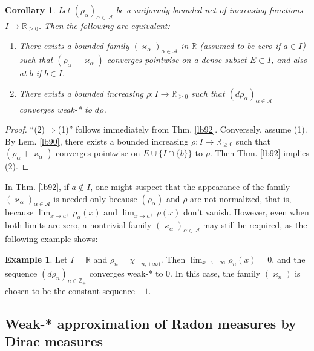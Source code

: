 \documentclass[12pt,b5paper,notitlepage]{article}
\theoremstyle{definition}
\newtheorem{eg}[df]{Example}
\theoremstyle{plain}
\newtheorem{co}[df]{Corollary}
\newcommand{\scr}{\mathscr}
\newcommand{\Zbb}{\mathbb Z}
\newcommand{\Rbb}{\mathbb R}
\newcommand{\SA}{\mathscr A}
\numberwithin{equation}{section}
\begin{document}
\begin{co}\label{lb95}
Let $(\rho_\alpha)_{\alpha\in\scr A}$ be a uniformly bounded net of increasing functions $I\rightarrow\Rbb_{\geq0}$. Then the following are equivalent:
\begin{enumerate}[label=(\arabic*)]
\item There exists a bounded family $(\varkappa_\alpha)_{\alpha\in\scr A}$ in $\Rbb$ (assumed to be zero if $a\in I$) such that $(\rho_\alpha+\varkappa_\alpha)$ converges pointwise on a dense subset $E\subset I$, and also at $b$ if $b\in I$.
\item There exists a bounded increasing $\rho:I\rightarrow\Rbb_{\geq0}$ such that $(d\rho_\alpha)_{\alpha\in\scr A}$ converges weak-* to $d\rho$.
\end{enumerate}
\end{co}


\begin{proof}
``(2)$\Rightarrow$(1)'' follows immediately from Thm. \ref{lb92}. Conversely, assume (1). By Lem. \ref{lb90}, there exists a bounded increasing $\rho:I\rightarrow\Rbb_{\geq0}$ such that $(\rho_\alpha+\varkappa_\alpha)$ converges pointwise on $E\cup\{I\cap\{b\}\}$ to $\rho$. Then Thm. \ref{lb92} implies (2).
\end{proof}


In Thm. \ref{lb92}, if $a\notin I$, one might suspect that the appearance of the family $(\varkappa_\alpha)_{\alpha\in\SA}$ is needed only because $(\rho_\alpha)$ and $\rho$ are not normalized, that is, because $\lim_{x\rightarrow a^+}\rho_\alpha(x)$ and $\lim_{x\rightarrow a^+}\rho(x)$ don't vanish. However, even when both limits are zero, a nontrivial family $(\varkappa_\alpha)_{\alpha\in\SA}$ may still be required, as the following example shows:

\begin{eg}
Let $I=\Rbb$ and $\rho_n=\chi_{[-n,+\infty)}$. Then $\lim_{x\rightarrow-\infty}\rho_n(x)=0$, and the sequence $(d\rho_n)_{n\in\Zbb_+}$ converges weak-* to $0$. In this case, the family $(\varkappa_n)$ is chosen to be the constant sequence $-1$.
\end{eg}









\subsection{Weak-* approximation of Radon measures by Dirac measures}
\end{document}
